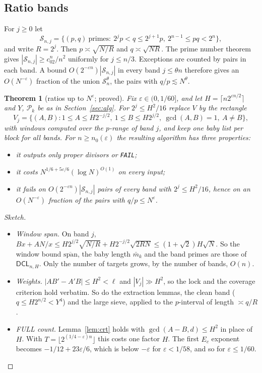 \documentclass[11pt]{amsart}
\newtheorem{theorem}{Theorem}[section]
\theoremstyle{definition}
\newcommand{\Pk}{\mathcal{P}_k}
\newcommand{\mbar}{\bar m_k}
\newcommand{\spanbar}{\overline{\mathrm{span}}}
\newcommand{\DCL}{\textsf{DCL}}
\begin{document}
\subsection{Ratio bands}
For $j\ge0$ let
\[
  \mathcal S_{n,j}=\{(p,q)\ \text{primes}:\ 2^jp<q\le2^{j+1}p,\ 2^{n-1}\le pq<2^n\},
\]
and write $R=2^j$. Then $p\asymp\sqrt{N/R}$ and $q\asymp\sqrt{NR}$. The prime number theorem
gives $|\mathcal S_{n,j}|\ge c_02^n/n^2$ uniformly for $j\le n/3$. Exceptions are counted by pairs
in each band. A bound $O(2^{-\varepsilon n})|\mathcal S_{n,j}|$ in every band $j\le\theta n$
therefore gives an $O(N^{-\varepsilon})$ fraction of the union $\mathcal S_n^\theta$, the pairs
with $q/p\lesssim N^\theta$.

\begin{theorem}[ratios up to $N^{\varepsilon}$; proved]\label{thm:U}
Fix $\varepsilon\in(0,1/60]$, and let $H=\lceil n2^{\varepsilon n/2}\rceil$ and $Y$, $\Pk$ be as
in Section~\ref{sec:alg}. For $2^j\le H^2/16$ replace $V$ by the rectangle
\[
  V_j=\{(A,B):1\le A\le H2^{-j/2},\ 1\le B\le H2^{j/2},\ \gcd(A,B)=1,\ A\ne B\},
\]
with windows computed over the $p$-range of band $j$, and keep one baby list per block for all
bands. For $n\ge n_0(\varepsilon)$ the resulting algorithm has three properties:
\begin{itemize}
\item it outputs only proper divisors or \texttt{FAIL};
\item it costs $N^{1/6+5\varepsilon/6}(\log N)^{O(1)}$ on every input;
\item it fails on $O(2^{-\varepsilon n})|\mathcal S_{n,j}|$ pairs of every band with
  $2^j\le H^2/16$, hence on an $O(N^{-\varepsilon})$ fraction of the pairs with
  $q/p\le N^{\varepsilon}$.
\end{itemize}
\end{theorem}
\begin{proof}[Sketch]
\begin{itemize}
\item \emph{Window span.} On band $j$, $Bx+AN/x\le H2^{j/2}\sqrt{N/R}+H2^{-j/2}\sqrt{2RN}\le
  (1+\sqrt2)H\sqrt N$. So the window bound $\spanbar$, the baby length $\mbar$ and the band
  primes are those of $\DCL_{n,H}$. Only the number of targets grows, by the number of bands,
  $O(n)$.
\item \emph{Weights.} $|AB'-A'B|\le H^2<\ell$ and $|V_j|\gg H^2$, so the lock and the coverage
  criterion hold verbatim. So do the extraction lemmas, the clean band ($q\le H2^{n/2}<Y^4$) and
  the large sieve, applied to the $p$-interval of length $\asymp q/R$.
\item \emph{FULL count.} Lemma~\ref{lem:crt} holds with $\gcd(A-B,d)\le H^2$ in place of $H$.
  With $T=\lfloor2^{(1/4-\varepsilon)n}\rfloor$ this costs one factor $H$. The first $E_c$
  exponent becomes $-1/12+23\varepsilon/6$, which is below $-\varepsilon$ for
  $\varepsilon<1/58$, and so for $\varepsilon\le1/60$.
\end{itemize}
\end{proof}
\end{document}
